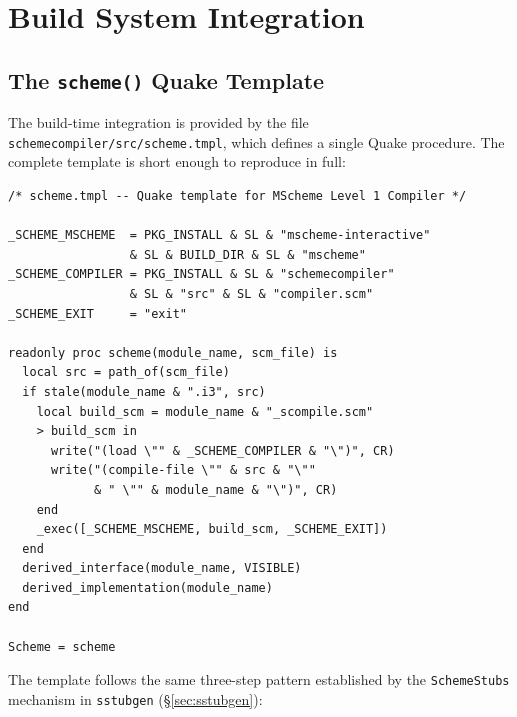 \documentclass[12pt]{report}
\begin{document}
\section{Build System Integration}
\label{sec:impl-build}

\subsection{The \texttt{scheme()} Quake Template}

The build-time integration is provided by the file
\texttt{schemecompiler/src/scheme.tmpl}, which defines a single
Quake procedure.  The complete template is short enough to reproduce
in full:

\begin{lstlisting}
/* scheme.tmpl -- Quake template for MScheme Level 1 Compiler */

_SCHEME_MSCHEME  = PKG_INSTALL & SL & "mscheme-interactive"
                 & SL & BUILD_DIR & SL & "mscheme"
_SCHEME_COMPILER = PKG_INSTALL & SL & "schemecompiler"
                 & SL & "src" & SL & "compiler.scm"
_SCHEME_EXIT     = "exit"

readonly proc scheme(module_name, scm_file) is
  local src = path_of(scm_file)
  if stale(module_name & ".i3", src)
    local build_scm = module_name & "_scompile.scm"
    > build_scm in
      write("(load \"" & _SCHEME_COMPILER & "\")", CR)
      write("(compile-file \"" & src & "\""
            & " \"" & module_name & "\")", CR)
    end
    _exec([_SCHEME_MSCHEME, build_scm, _SCHEME_EXIT])
  end
  derived_interface(module_name, VISIBLE)
  derived_implementation(module_name)
end

Scheme = scheme
\end{lstlisting}

The template follows the same three-step pattern established by the
\texttt{SchemeStubs} mechanism in \texttt{sstubgen}
(\S\ref{sec:sstubgen}):
\end{document}
